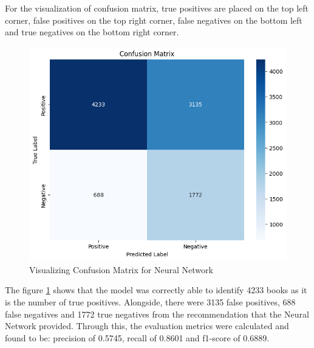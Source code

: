 For the visualization of confusion matrix, true positives are placed on the top left corner, false positives on the top right corner, false negatives on the bottom left and true negatives on the bottom right corner.

\begin{figure}[h]
        \centering
        \includegraphics[width=1\linewidth]{img/Graphics/conf-nn.png}
        \caption{Visualizing Confusion Matrix for Neural Network}
        \label{conf-nn}
    \end{figure}

    \newpage

The figure \ref{conf-nn} shows that the model was correctly able to identify 4233 books as it is the number of true positives. Alongside, there were 3135 false positives, 688 false negatives and 1772 true negatives from the recommendation that the Neural Network provided. Through this, the evaluation metrics were calculated and found to be: precision of 0.5745, recall of 0.8601 and f1-score of 0.6889.

